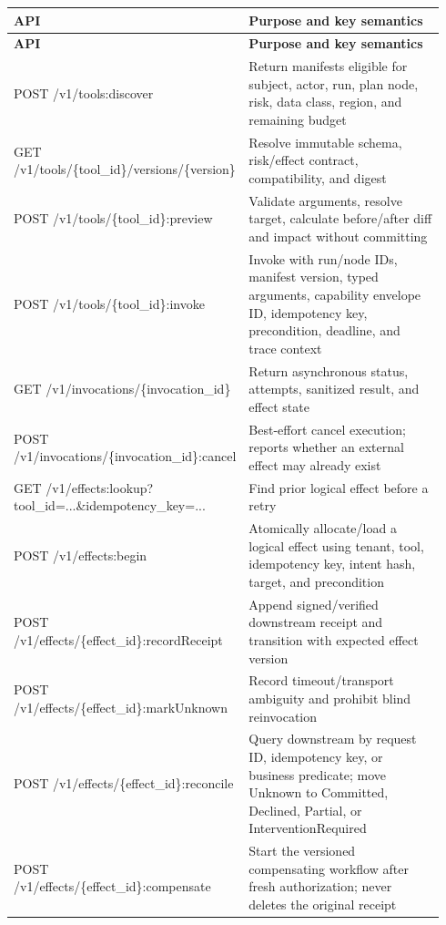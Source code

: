 \BookTableStart
\small
\begin{longtable}{@{}Y{0.4700\linewidth}Y{0.4700\linewidth}@{}}
\color{white}\bfseries \textbf{API} & \color{white}\bfseries \textbf{Purpose and key semantics} \\
\endfirsthead
{}
\color{white}\bfseries \textbf{API} & \color{white}\bfseries \textbf{Purpose and key semantics} \\
\endhead
POST /v1/tools:discover & Return manifests eligible for subject, actor, run, plan node, risk, data class, region, and remaining budget \\
GET /v1/tools/\{tool\_id\}/versions/\{version\} & Resolve immutable schema, risk/effect contract, compatibility, and digest \\
POST /v1/tools/\{tool\_id\}:preview & Validate arguments, resolve target, calculate before/after diff and impact without committing \\
POST /v1/tools/\{tool\_id\}:invoke & Invoke with run/node IDs, manifest version, typed arguments, capability envelope ID, idempotency key, precondition, deadline, and trace context \\
GET /v1/invocations/\{invocation\_id\} & Return asynchronous status, attempts, sanitized result, and effect state \\
POST /v1/invocations/\{invocation\_id\}:cancel & Best-effort cancel execution; reports whether an external effect may already exist \\
GET /v1/effects:lookup?tool\_id=...\&idempotency\_key=... & Find prior logical effect before a retry \\
POST /v1/effects:begin & Atomically allocate/load a logical effect using tenant, tool, idempotency key, intent hash, target, and precondition \\
POST /v1/effects/\{effect\_id\}:recordReceipt & Append signed/verified downstream receipt and transition with expected effect version \\
POST /v1/effects/\{effect\_id\}:markUnknown & Record timeout/transport ambiguity and prohibit blind reinvocation \\
POST /v1/effects/\{effect\_id\}:reconcile & Query downstream by request ID, idempotency key, or business predicate; move Unknown to Committed, Declined, Partial, or InterventionRequired \\
POST /v1/effects/\{effect\_id\}:compensate & Start the versioned compensating workflow after fresh authorization; never deletes the original receipt \\

\end{longtable}
